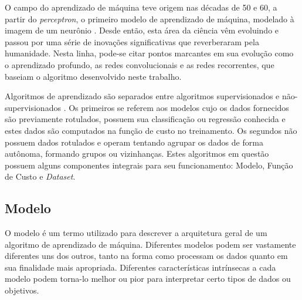 O campo do aprendizado de máquina teve origem nas décadas de 50 e 60, a partir do \textit{perceptron}, o primeiro modelo de aprendizado de máquina, modelado à imagem de um neurônio \cite{minsky69perceptrons}. Desde então, esta área da ciência vêm evoluindo e passou por uma série de  inovações significativas que reverberaram pela humanidade. Nesta linha, pode-se citar pontos marcantes em sua evolução como o aprendizado profundo, as redes convolucionais e as redes recorrentes, que baseiam o algoritmo desenvolvido neste trabalho.

Algoritmos de aprendizado são separados entre algoritmos supervisionados e não-supervisionados \cite{bishop1995neural}. Os primeiros se referem aos modelos cujo os dados fornecidos são previamente rotulados, possuem sua classificação ou regressão conhecida e estes dados são computados na função de custo no treinamento. Os segundos não possuem dados rotulados e operam tentando agrupar os dados de forma autônoma, formando grupos ou vizinhanças. Estes algoritmos em questão possuem alguns componentes integrais para seu funcionamento: Modelo, Função de Custo e \textit{Dataset}.

\subsection{\textbf{Modelo}}

O modelo é um termo utilizado para descrever a arquitetura geral de um algoritmo de aprendizado de máquina. Diferentes modelos podem ser vastamente diferentes uns dos outros, tanto na forma como processam os dados quanto em sua finalidade mais apropriada. Diferentes características intrínsecas a cada modelo podem torna-lo melhor ou pior para interpretar certo tipos de dados ou objetivos.




